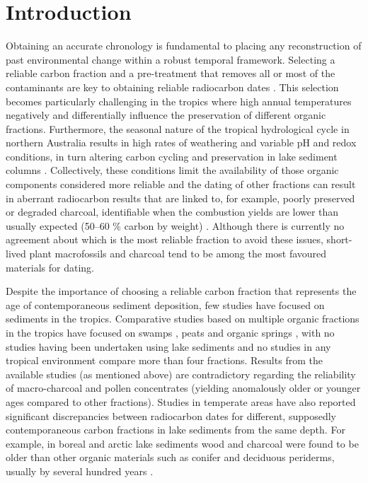 \documentclass[
  12pt,
]{book}
\begin{document}
\hypertarget{introduction-1}{%
\section{Introduction}\label{introduction-1}}

Obtaining an accurate chronology is fundamental to placing any reconstruction of past environmental change within a robust temporal framework. Selecting a reliable carbon fraction and a pre-treatment that removes all or most of the contaminants are key to obtaining reliable radiocarbon dates \citep{pettittPalaeolithicRadiocarbonChronology2003, bronkramseyRadiocarbonDatingRevolutions2008}. This selection becomes particularly challenging in the tropics where high annual temperatures negatively and differentially influence the preservation of different organic fractions. Furthermore, the seasonal nature of the tropical hydrological cycle in northern Australia results in high rates of weathering and variable pH and redox conditions, in turn altering carbon cycling and preservation in lake sediment columns \citep{birdRadiocarbonAnalysisEarly2002, highamRadiocarbonDatingCharcoal2009}. Collectively, these conditions limit the availability of those organic components considered more reliable and the dating of other fractions can result in aberrant radiocarbon results that are linked to, for example, poorly preserved or degraded charcoal, identifiable when the combustion yields are lower than usually expected (50--60 \% carbon by weight) \citep{highamRadiocarbonDatingCharcoal2009}. Although there is currently no agreement about which is the most reliable fraction to avoid these issues, short-lived plant macrofossils and charcoal \citep{cohenPaleolimnologyHistoryEvolution2003, martinRadiocarbonAgesDifferent2019} tend to be among the most favoured materials for dating.

Despite the importance of choosing a reliable carbon fraction that represents the age of contemporaneous sediment deposition, few studies have focused on sediments in the tropics. Comparative studies based on multiple organic fractions in the tropics have focused on swamps \citep{mayEstablishingChronologicalFramework2018}, peats \citep{wustComparisonRadiocarbonAges2008} and organic springs \citep{fieldUntanglingGeochronologicalComplexity2018}, with no studies having been undertaken using lake sediments and no studies in any tropical environment compare more than four fractions. Results from the available studies (as mentioned above) are contradictory regarding the reliability of macro-charcoal and pollen concentrates (yielding anomalously older or younger ages compared to other fractions). Studies in temperate areas have also reported significant discrepancies between radiocarbon dates for different, supposedly contemporaneous carbon fractions in lake sediments from the same depth. For example, in boreal and arctic lake sediments wood and charcoal were found to be older than other organic materials such as conifer and deciduous periderms, usually by several hundred years \citep{oswaldEffectsSampleMass2005}.
\end{document}
